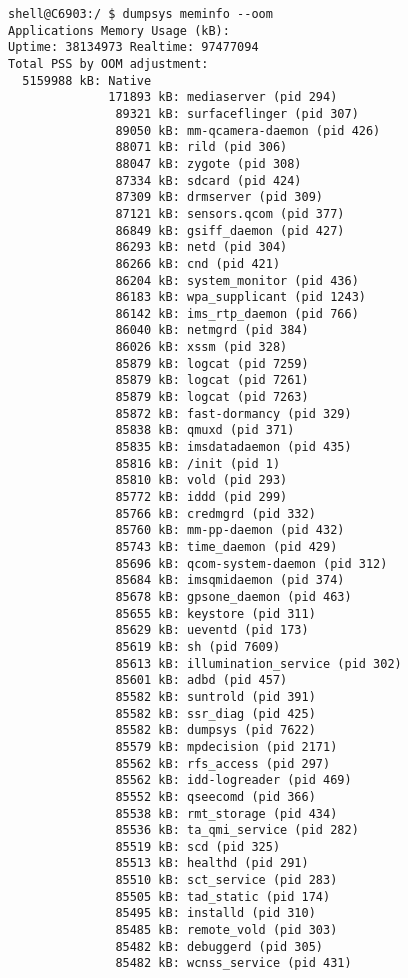 \begin{lstlisting}[frame=single] 
shell@C6903:/ $ dumpsys meminfo --oom
Applications Memory Usage (kB):
Uptime: 38134973 Realtime: 97477094
Total PSS by OOM adjustment:
  5159988 kB: Native
              171893 kB: mediaserver (pid 294)
               89321 kB: surfaceflinger (pid 307)
               89050 kB: mm-qcamera-daemon (pid 426)
               88071 kB: rild (pid 306)
               88047 kB: zygote (pid 308)
               87334 kB: sdcard (pid 424)
               87309 kB: drmserver (pid 309)
               87121 kB: sensors.qcom (pid 377)
               86849 kB: gsiff_daemon (pid 427)
               86293 kB: netd (pid 304)
               86266 kB: cnd (pid 421)
               86204 kB: system_monitor (pid 436)
               86183 kB: wpa_supplicant (pid 1243)
               86142 kB: ims_rtp_daemon (pid 766)
               86040 kB: netmgrd (pid 384)
               86026 kB: xssm (pid 328)
               85879 kB: logcat (pid 7259)
               85879 kB: logcat (pid 7261)
               85879 kB: logcat (pid 7263)
               85872 kB: fast-dormancy (pid 329)
               85838 kB: qmuxd (pid 371)
               85835 kB: imsdatadaemon (pid 435)
               85816 kB: /init (pid 1)
               85810 kB: vold (pid 293)
               85772 kB: iddd (pid 299)
               85766 kB: credmgrd (pid 332)
               85760 kB: mm-pp-daemon (pid 432)
               85743 kB: time_daemon (pid 429)
               85696 kB: qcom-system-daemon (pid 312)
               85684 kB: imsqmidaemon (pid 374)
               85678 kB: gpsone_daemon (pid 463)
               85655 kB: keystore (pid 311)
               85629 kB: ueventd (pid 173)
               85619 kB: sh (pid 7609)
               85613 kB: illumination_service (pid 302)
               85601 kB: adbd (pid 457)
               85582 kB: suntrold (pid 391)
               85582 kB: ssr_diag (pid 425)
               85582 kB: dumpsys (pid 7622)
               85579 kB: mpdecision (pid 2171)
               85562 kB: rfs_access (pid 297)
               85562 kB: idd-logreader (pid 469)
               85552 kB: qseecomd (pid 366)
               85538 kB: rmt_storage (pid 434)
               85536 kB: ta_qmi_service (pid 282)
               85519 kB: scd (pid 325)
               85513 kB: healthd (pid 291)
               85510 kB: sct_service (pid 283)
               85505 kB: tad_static (pid 174)
               85495 kB: installd (pid 310)
               85485 kB: remote_vold (pid 303)
               85482 kB: debuggerd (pid 305)
               85482 kB: wcnss_service (pid 431)

\end{lstlisting}
